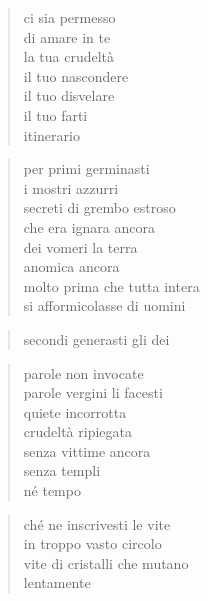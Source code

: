 	\begin{verse}
		ci sia permesso\\
		di amare in te\\
		la tua crudeltà\\
		il tuo nascondere\\
		il tuo disvelare\\
		il tuo farti\\
		itinerario
	\end{verse}

\clearpage


\vspace*{2cm}

	\begin{verse}
		per primi germinasti\\
		i mostri azzurri\\
		secreti di grembo estroso\\
		che era ignara ancora\\
		dei vomeri la terra\\
		anomica ancora\\
		molto prima che tutta intera\\
		si afformicolasse di uomini
	\end{verse}

\clearpage


\vspace*{2cm}

	\begin{verse}
		secondi generasti gli dei
	\end{verse}

	\begin{verse}
		parole non invocate\\
		parole vergini li facesti\\
		quiete incorrotta\\
		crudeltà ripiegata\\
		senza vittime ancora\\
		senza templi\\
		né tempo
	\end{verse}

	\begin{verse}
		ché ne inscrivesti le vite\\
		in troppo vasto circolo\\
		vite di cristalli che mutano\\
		lentamente
	\end{verse}

